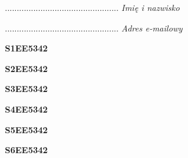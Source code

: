 \begin{turn}{90}\begin{minipage}{\linewidth} \vspace{20mm} ................................................  \textit{Imię i nazwisko}\end{minipage}\end{turn}

\begin{turn}{90}\begin{minipage}{\linewidth} \vspace{20mm} ................................................  \textit{Adres e-mailowy}\end{minipage}\end{turn}

\begin{turn}{90}\huge \begin{minipage}{\linewidth} \vspace{10mm}\textbf{S1EE5342}\end{minipage}\end{turn}

\begin{turn}{90}\huge \begin{minipage}{\linewidth} \vspace{10mm}\textbf{S2EE5342}\end{minipage}\end{turn}

\begin{turn}{90}\huge \begin{minipage}{\linewidth} \vspace{10mm}\textbf{S3EE5342}\end{minipage}\end{turn}

\begin{turn}{90}\huge \begin{minipage}{\linewidth} \vspace{10mm}\textbf{S4EE5342}\end{minipage}\end{turn}

\begin{turn}{90}\huge \begin{minipage}{\linewidth} \vspace{10mm}\textbf{S5EE5342}\end{minipage}\end{turn}

\begin{turn}{90}\huge \begin{minipage}{\linewidth} \vspace{10mm}\textbf{S6EE5342}\end{minipage}\end{turn}

